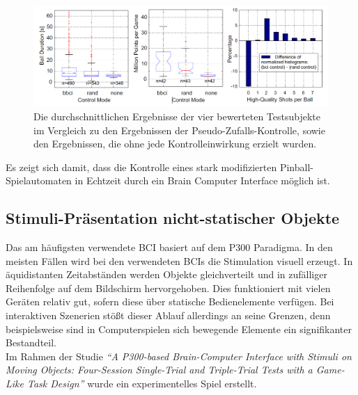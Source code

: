 \begin{figure}[h!]
\begin{center}
\includegraphics[scale=0.45]{images/PinballBCI.png}
\caption{Die durchschnittlichen Ergebnisse der vier bewerteten Testsubjekte im Vergleich zu den Ergebnissen der Pseudo-Zufalls-Kontrolle, sowie den Ergebnissen, die ohne jede Kontrolleinwirkung erzielt wurden.}
\label{PinballBCI}
\end{center}
\end{figure}

Es zeigt sich damit, dass die Kontrolle eines stark modifizierten Pinball-Spielautomaten in Echtzeit durch ein Brain Computer Interface möglich ist. \\











\pagebreak
\subsection{Stimuli-Präsentation nicht-statischer Objekte}
\vspace{0.3cm}
Das am häufigsten verwendete \acs{BCI} basiert auf dem P300 Paradigma. In den meisten Fällen wird bei den verwendeten BCIs die Stimulation visuell erzeugt.
In äquidistanten Zeitabständen werden Objekte gleichverteilt und in zufälliger Reihenfolge auf dem Bildschirm hervorgehoben.
Dies funktioniert mit vielen Geräten relativ gut, sofern diese über statische Bedienelemente verfügen. 
Bei interaktiven Szenerien stößt dieser Ablauf allerdings an seine Grenzen,
denn beispielsweise sind in Computerspielen sich bewegende Elemente ein signifikanter Bestandteil.\\

Im Rahmen der Studie 
\textit{"`A P300-based Brain-Computer Interface with Stimuli on Moving Objects: Four-Session Single-Trial and Triple-Trial Tests with a Game-Like Task Design"'} 
\cite[S.5ff]{P300Moving} wurde ein experimentelles Spiel erstellt.


